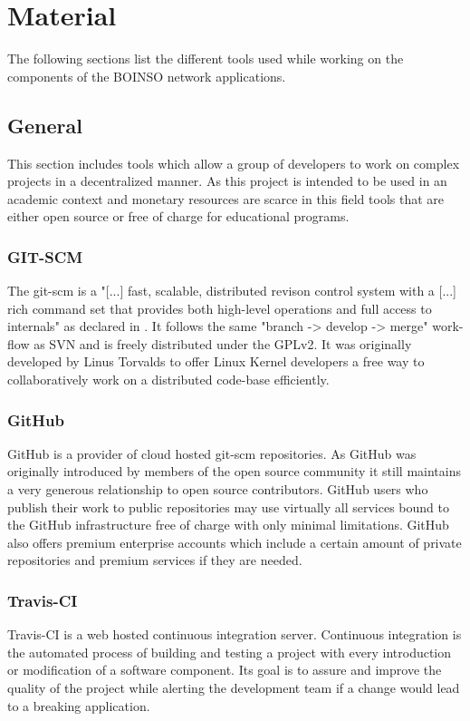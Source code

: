 \documentclass[BachelorPaper]{subfiles}
\begin{document}
\chapter{Material}
The following sections list the different tools used while working on the components of the BOINSO network applications.

\section{General}
This section includes tools which allow a group of developers to work on complex projects in a decentralized manner. As this project is intended to be used in an academic context and monetary resources are scarce in this field tools that are either open source or free of charge for educational programs.

\subsection{GIT-SCM}
The \ac{git-scm} is a "[...] fast, scalable, distributed revison control system with a [...] rich command set that provides both high-level operations and full access to internals" as declared in \cite{git_scm}. It follows the same "branch -> develop -> merge" work-flow as \ac{SVN} and is freely distributed under the \ac{GPLv2}. It was originally developed by Linus Torvalds to offer Linux Kernel developers a free way to collaboratively work on a distributed code-base efficiently.

\subsection{GitHub}
GitHub is a provider of cloud hosted \ac{git-scm} repositories. As GitHub was originally introduced by members of the open source community it still maintains a very generous relationship to open source contributors. GitHub users who publish their work to public repositories may use virtually all services bound to the GitHub infrastructure free of charge with only minimal limitations. GitHub also offers premium enterprise accounts which include a certain amount of private repositories and premium services if they are needed.

\subsection{Travis-CI}
Travis-CI is a web hosted continuous integration server. Continuous integration is the automated process of building and testing a project with every introduction or modification of a software component. Its goal is to assure and improve the quality of the project while alerting the development team if a change would lead to a breaking application.\\
\end{document}
